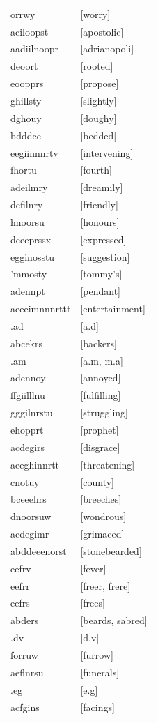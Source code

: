 \documentclass{article}
\begin{document}
\begin{tabular}{ll}
orrwy & [worry] \\
aciloopst & [apostolic] \\
aadiilnoopr & [adrianopoli] \\
deoort & [rooted] \\
eoopprs & [propose] \\
ghillsty & [slightly] \\
dghouy & [doughy] \\
bdddee & [bedded] \\
eegiinnnrtv & [intervening] \\
fhortu & [fourth] \\
adeilmry & [dreamily] \\
defilnry & [friendly] \\
hnoorsu & [honours] \\
deeeprssx & [expressed] \\
egginosstu & [suggestion] \\
'mmosty & [tommy's] \\
adennpt & [pendant] \\
aeeeimnnnrttt & [entertainment] \\
.ad & [a.d] \\
abcekrs & [backers] \\
.am & [a.m, m.a] \\
adennoy & [annoyed] \\
ffgiilllnu & [fulfilling] \\
gggilnrstu & [struggling] \\
ehopprt & [prophet] \\
acdegirs & [disgrace] \\
aeeghinnrtt & [threatening] \\
cnotuy & [county] \\
bceeehrs & [breeches] \\
dnoorsuw & [wondrous] \\
acdegimr & [grimaced] \\
abddeeenorst & [stonebearded] \\
eefrv & [fever] \\
eefrr & [freer, frere] \\
eefrs & [frees] \\
abders & [beards, sabred] \\
.dv & [d.v] \\
forruw & [furrow] \\
aeflnrsu & [funerals] \\
.eg & [e.g] \\
acfgins & [facings] \\

\end{tabular}
\end{document}
